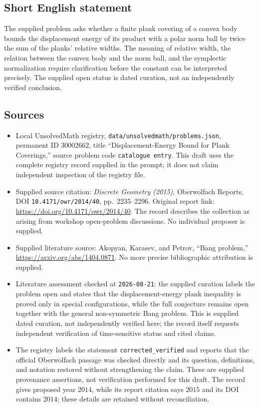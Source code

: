 \documentclass[11pt]{article}
\begin{document}
\subsection{Short English statement}
The supplied problem asks whether a finite plank covering of a convex body bounds the displacement energy of its product with a polar norm ball by twice the sum of the planks' relative widths. The meaning of relative width, the relation between the convex body and the norm ball, and the symplectic normalization require clarification before the constant can be interpreted precisely. The supplied open status is dated curation, not an independently verified conclusion.
\subsection{Sources}
\begin{itemize}
\item Local UnsolvedMath registry, \texttt{data/unsolvedmath/problems.json}, permanent ID \(30002662\), title ``Displacement-Energy Bound for Plank Coverings,'' source problem code \texttt{catalogue entry}. This draft uses the complete registry record supplied in the prompt; it does not claim independent inspection of the registry file.
\item Supplied source citation: \emph{Discrete Geometry (2015)}, Oberwolfach Reports, DOI \texttt{10.4171/owr/2014/40}, pp.\ 2235--2296. Original report link: \url{https://doi.org/10.4171/owr/2014/40}. The record describes the collection as arising from workshop open-problem discussions. No individual proposer is supplied.
\item Supplied literature source: Akopyan, Karasev, and Petrov, ``Bang problem,'' \url{https://arxiv.org/abs/1404.0871}. No more precise bibliographic attribution is supplied.
\item Literature assessment checked at \texttt{2026-08-21}: the supplied curation labels the problem open and states that the displacement-energy plank inequality is proved only in special configurations, while the full conjecture remains open together with the general non-symmetric Bang problem. This is supplied dated curation, not independently verified here; the record itself requests independent verification of time-sensitive status and cited claims.
\item The registry labels the statement \texttt{corrected\_verified} and reports that the official Oberwolfach passage was checked directly and its question, definitions, and notation restored without strengthening the claim. These are supplied provenance assertions, not verification performed for this draft. The record gives proposed year \(2014\), while its report citation says \(2015\) and its DOI contains \(2014\); these details are retained without reconciliation.
\end{itemize}
\end{document}
